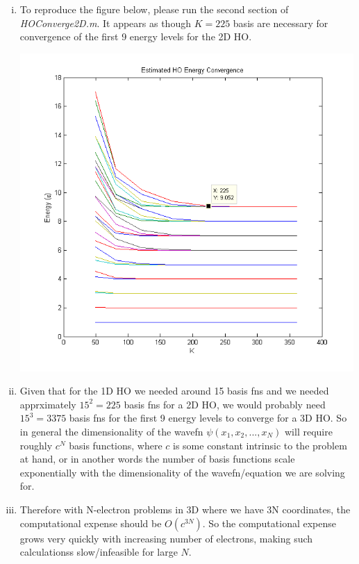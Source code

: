 \documentclass{article}
\begin{document}
\begin{enumerate}[i.]
  \item To reproduce the figure below, please run the second section of \textit{HOConverge2D.m}. It appears as though $K=225$ basis are necessary for convergence of the first 9 energy levels for the 2D HO.
    \begin{center}
      \includegraphics[scale=0.6]{prob4part2.png}
    \end{center}

  \item Given that for the 1D HO we needed around 15 basis fns and we needed apprximately $15^2 = 225$ basis fns for a 2D HO, we would probably need $15^3 = 3375$ basis fns for the first 9 energy levels to converge for a 3D HO. So in general the dimensionality of the wavefn $\psi (x_1, x_2,...,x_N)$ will require roughly $c^N$ basis functions, where $c$ is some constant intrinsic to the problem at hand, or in another words the number of basis functions scale exponentially with the dimensionality of the wavefn/equation we are solving for.

  \item Therefore with N-electron problems in 3D where we have 3N coordinates, the computational expense should be $O(c^{3N})$. So the computational expense grows very quickly with increasing number of electrons, making such calculationss slow/infeasible for large $N$.

\end{enumerate}
\end{document}
